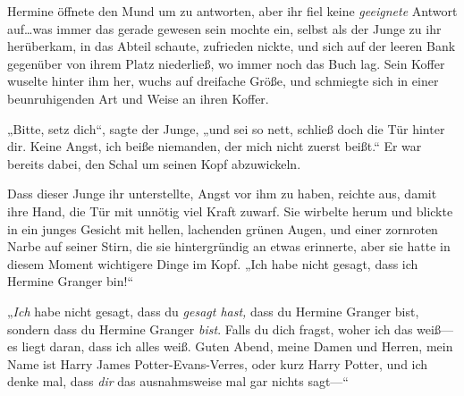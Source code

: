 Hermine öffnete den Mund um zu antworten, aber ihr fiel keine \emph{geeignete} Antwort auf…was immer das gerade gewesen sein mochte ein, selbst als der Junge zu ihr herüberkam, in das Abteil schaute, zufrieden nickte, und sich auf der leeren Bank gegenüber von ihrem Platz niederließ, wo immer noch das Buch lag. Sein Koffer wuselte hinter ihm her, wuchs auf dreifache Größe, und schmiegte sich in einer beunruhigenden Art und Weise an ihren Koffer.

„Bitte, setz dich“, sagte der Junge, „und sei so nett, schließ doch die Tür hinter dir. Keine Angst, ich beiße niemanden, der mich nicht zuerst beißt.“ Er war bereits dabei, den Schal um seinen Kopf abzuwickeln.

Dass dieser Junge ihr unterstellte, Angst vor ihm zu haben, reichte aus, damit ihre Hand, die Tür mit unnötig viel Kraft zuwarf. Sie wirbelte herum und blickte in ein junges Gesicht mit hellen, lachenden grünen Augen, und einer zornroten Narbe auf seiner Stirn, die sie hintergründig an etwas erinnerte, aber sie hatte in diesem Moment wichtigere Dinge im Kopf. „Ich habe nicht gesagt, dass ich Hermine Granger bin!“

„\emph{Ich} habe nicht gesagt, dass du \emph{gesagt hast,} dass du Hermine Granger bist, sondern dass du Hermine Granger \emph{bist}. Falls du dich fragst, woher ich das weiß—es liegt daran, dass ich alles weiß. Guten Abend, meine Damen und Herren, mein Name ist Harry James Potter-Evans-Verres, oder kurz Harry Potter, und ich denke mal, dass \emph{dir} das ausnahmsweise mal gar nichts sagt—“

